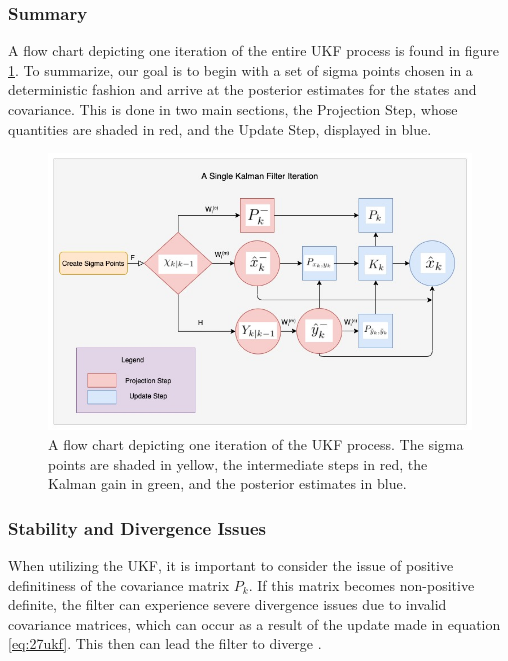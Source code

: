     \subsubsection{Summary}
    A flow chart depicting one iteration of the entire UKF process is found in figure \ref{fig:UKF_Theory_FlowChart}. To summarize, our goal is to begin with a set of sigma points chosen in a deterministic fashion and arrive at the posterior estimates for the states and covariance. This is done in two main sections, the Projection Step, whose quantities are shaded in red, and the Update Step, displayed in blue.
    
    \begin{figure} [H]
    \centering
    \includegraphics[scale = 0.6]{Kalman_Filter_Images/UKFFlowDiagram.jpg}
    \caption{A flow chart depicting one iteration of the UKF process. The sigma points are shaded in yellow, the intermediate steps in red, the Kalman gain in green, and the posterior estimates in blue.}
    \label{fig:UKF_Theory_FlowChart}
    \end{figure}
    
    \subsubsection{Stability and Divergence Issues}
    When utilizing the UKF, it is important to consider the issue of positive definitiness of the covariance matrix $P_k$. If this matrix becomes non-positive definite, the filter can experience severe divergence issues due to invalid covariance matrices, which can occur as a result of the update made in equation \ref{eq:27ukf}. This then can lead the filter to diverge \cite{SimonHaykinText}. \\
    

